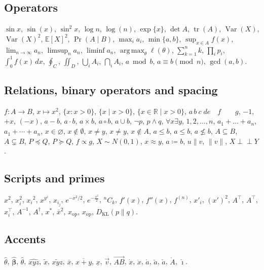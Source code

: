 \documentclass[11pt,letterpaper]{article}
\theoremstyle{definition}
\theoremstyle{remark}
\DeclareMathOperator{\Var}{Var}
\DeclareMathOperator{\tr}{tr}
\DeclareMathOperator*{\argmax}{arg\,max}
\newcommand{\E}{\mathbb{E}}
\newcommand{\R}{\mathbb{R}}
\newcommand{\mr}{\mathrm}
\newcommand{\KL}{D_\mathrm{KL}}
\begin{document}
\subsection{Operators}

$\sin x$, $\sin(x)$, $\sin^2 x$, $\log n$, $\log(n)$, $\exp\{x\}$, $\det A$, $\tr(A)$, $\Var(X)$, $\Var(X)^2$, $\E[X]^2$, $\Pr(A \mid B)$,
$\max_{i} a_i$, $\min\{a, b\}$, $\sup_{x \in A} f(x)$, $\lim_{n\to\infty} a_n$, $\limsup_{n} a_n$, $\liminf a_n$, $\argmax_\theta \ell(\theta)$,
$\sum_{k=1}^n k$, $\prod_i p_i$, $\int_0^1 f(x)\,dx$, $\oint_C$, $\iint_D$, $\bigcup_i A_i$, $\bigcap_{i} A_i$,
$a \bmod b$, $a \equiv b \pmod{n}$, $\gcd(a, b)$.

\subsection{Relations, binary operators and spacing}

$f\colon A \to B$, $x \mapsto x^2$, $\{x : x > 0\}$, $\{x \mid x > 0\}$, $\{x \in \R \;\big|\; x > 0\}$,
$a\,b\:c\;d\!e\quad f\qquad g$,
$-1$, $+x$, $(-x)$, $a - b$, $a \cdot b$, $a \times b$, $a \circ b$, $a \cup b$, $\neg p$, $p \wedge q$, $\forall x \exists y$,
$1, 2, \dots, n$, $a_1 + \dots + a_n$, $a_1 + \cdots + a_n$, $x \in \varnothing$, $x \notin \emptyset$,
$x \neq y$, $x \not= y$, $x \not\in A$, $a \leq b$, $a \leqslant b$, $a \nleq b$, $A \subseteq B$, $A \subsetneq B$, $P \preceq Q$, $P \succcurlyeq Q$, $f \propto g$, $X \sim N(0, 1)$, $x \approx y$, $a \coloneqq b$, $u \parallel v$, $\|v\|$, $X \perp\!\!\!\perp Y$.

\subsection{Scripts and primes}

$x^2$, $x_i^2$, ${x_i}^2$, $x^{y^z}$, $x_{i_j}$, $e^{-x^2/2}$, $e^{-\frac{x^2}{2}}$, ${}^n C_k$, $f'(x)$, $f''(x)$, $f^{(n)}$, $x'_i$, $(x')^2$, $A^\top$, $A^{\top}$, $x_i^\top$, $A^{-1}$, $A^\dagger$, $x^*$, $\bar{x}^2$,
$x_\mathrm{op}$, $x_\mr{op}$, $\KL(p \parallel q)$.

\subsection{Accents}

$\hat{\theta}$, $\hat{\bm\beta}$, $\widehat{\theta}$, $\widehat{xyz}$, $\tilde{x}$, $\widetilde{xyz}$, $\bar{x}$, $\overline{x + y}$, $\underline{x}$, $\vec{v}$, $\overrightarrow{AB}$, $\dot{x}$, $\ddot{x}$, $\acute{a}$, $\breve{a}$, $\check{a}$, $\mathring{A}$, $\hat{\imath}$.
\end{document}

